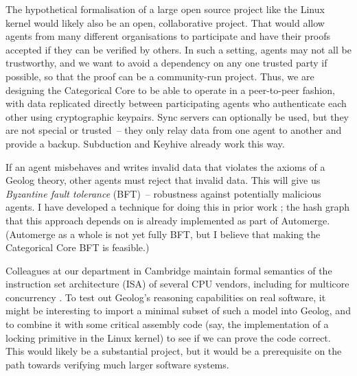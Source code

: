 \documentclass{article}
\begin{document}
The hypothetical formalisation of a large open source project like the Linux kernel would likely also be an open, collaborative project.
That would allow agents from many different organisations to participate and have their proofs accepted if they can be verified by others.
In such a setting, agents may not all be trustworthy, and we want to avoid a dependency on any one trusted party if possible, so that the proof can be a community-run project.
Thus, we are designing the Categorical Core to be able to operate in a peer-to-peer fashion, with data replicated directly between participating agents who authenticate each other using cryptographic keypairs.
Sync servers can optionally be used, but they are not special or trusted~-- they only relay data from one agent to another and provide a backup.
Subduction and Keyhive already work this way.

If an agent misbehaves and writes invalid data that violates the axioms of a Geolog theory, other agents must reject that invalid data.
This will give us \emph{Byzantine fault tolerance} (BFT)~-- robustness against potentially malicious agents.
I have developed a technique for doing this in prior work \citep{kleppmann-2022-bft}; the hash graph that this approach depends on is already implemented as part of Automerge.
(Automerge as a whole is not yet fully BFT, but I believe that making the Categorical Core BFT is feasible.)

Colleagues at our department in Cambridge maintain formal semantics of the instruction set architecture (ISA) of several CPU vendors, including for multicore concurrency \citep{armstrong-2024-sail}.
To test out Geolog's reasoning capabilities on real software, it might be interesting to import a minimal subset of such a model into Geolog, and to combine it with some critical assembly code (say, the implementation of a locking primitive in the Linux kernel) to see if we can prove the code correct.
This would likely be a substantial project, but it would be a prerequisite on the path towards verifying much larger software systems.
\end{document}
